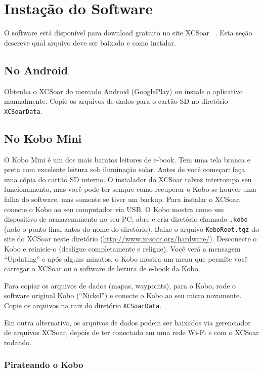\section{Instação do Software}

O software está disponível para download gratuito no site XCSoar    
~\xcsoarwebsite{}.  Esta seção descreve qual arquivo deve ser baixado e como instalar.

\subsection*{No Android}

Obtenha o XCSoar do mercado Android (GooglePlay) ou instale o aplicativo manualmente.  Copie os arquivos de dados para o cartão SD no diretório 
\verb|XCSoarData|.

\subsection*{No Kobo Mini}

O Kobo Mini é um dos mais baratos leitores de e-book.  Tem uma tela branca e preta com excelente leitura sob iluminação solar.  
Antes de você começar: faça uma cópia do cartão SD interno.  O instalador do XCSoar talvez interrompa seu funcionamento, mas você pode ter sempre como recuperar o Kobo se houver uma falha do software, mas somente se tiver um backup.
Para instalar o XCSoar, conecte o Kobo ao seu computador via USB. O Kobo mostra como um dispositivo de armazenamento no seu PC; abre e cria diretório chamado \texttt{.kobo} (note o ponto final antes do nome do diretório).  Baixe o arquivo \texttt{KoboRoot.tgz} do site do XCSoar neste diretório (\url{http://www.xcsoar.org/hardware/}). Desconecte o Kobo e reinicie-o (desligue completamente e religue).  Você verá a mensagem “Updating” e após alguns minutos, o Kobo mostra um menu que permite você carregar o XCSoar ou o software de leitura de e-book da Kobo.

Para copiar os arquivos de dados (mapas, waypoints), para o Kobo, rode o software original Kobo (“Nickel”) e conecte o Kobo ao seu micro novamente.  Copie os arquivos na raiz do diretório  \texttt{XCSoarData}.

Em outra alternativa, os arquivos de dados podem ser baixados via gerenciador de arquivos XCSoar, depois de ter conectado em uma rede Wi-Fi e com o XCSoar rodando.

\subsubsection{Pirateando o Kobo}

